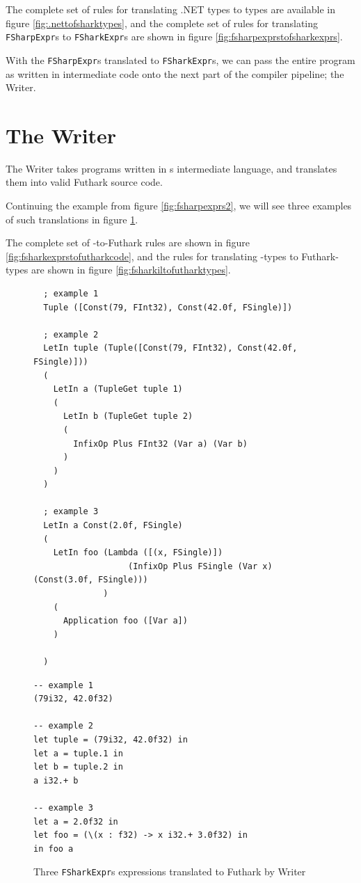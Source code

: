 The complete set of rules for translating .NET types to \fshark{} types are
available in figure \ref{fig:.nettofsharktypes}, and the complete set of rules
for translating \texttt{FSharpExpr}s to \texttt{FSharkExpr}s are shown in figure \ref{fig:fsharpexprstofsharkexprs}.

With the \texttt{FSharpExpr}s translated to \texttt{FSharkExpr}s, we can pass
the entire program as written in \fshark{} intermediate code onto the next part
of the compiler pipeline; the \fshark{}Writer.
\section{The \fshark{}Writer}
The \fshark{}Writer takes programs written in \fshark{}s intermediate language,
and translates them into valid Futhark source code.

Continuing the example from figure \ref{fig:fsharpexprs2}, we will see three
examples of such translations in figure \ref{fig:fsharkexprs3}.

The complete set of \fsharkexpr{}-to-Futhark rules are shown in figure
\ref{fig:fsharkexprstofutharkcode}, and the rules for translating \fsharkil{}-types to
Futhark-types are shown in figure \ref{fig:fsharkiltofutharktypes}.

\begin{figure}[H]
  \centering
\begin{verbatim}
  ; example 1
  Tuple ([Const(79, FInt32), Const(42.0f, FSingle)])

  ; example 2
  LetIn tuple (Tuple([Const(79, FInt32), Const(42.0f, FSingle)]))
  ( 
    LetIn a (TupleGet tuple 1) 
    (
      LetIn b (TupleGet tuple 2) 
      (
        InfixOp Plus FInt32 (Var a) (Var b)
      )       
    )
  )

  ; example 3
  LetIn a Const(2.0f, FSingle)
  (
    LetIn foo (Lambda ([(x, FSingle)]) 
                   (InfixOp Plus FSingle (Var x) (Const(3.0f, FSingle)))
              )
    (
      Application foo ([Var a])
    )

  )
\end{verbatim}
\begin{lstlisting}[language=Futhark]
-- example 1
(79i32, 42.0f32)

-- example 2
let tuple = (79i32, 42.0f32) in
let a = tuple.1 in
let b = tuple.2 in
a i32.+ b

-- example 3
let a = 2.0f32 in
let foo = (\(x : f32) -> x i32.+ 3.0f32) in
in foo a
\end{lstlisting}
  \caption{Three \texttt{FSharkExpr}s expressions translated to Futhark by
    \fshark{}Writer}
  \label{fig:fsharkexprs3}
\end{figure}

